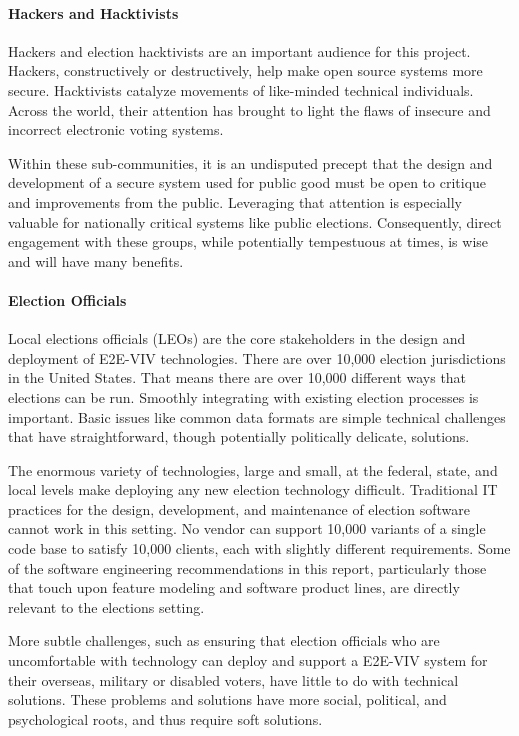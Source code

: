 \paragraph{Hackers and Hacktivists} 
Hackers and election hacktivists are an important audience for this
project. Hackers, constructively or destructively, help make open
source systems more secure. Hacktivists catalyze movements of
like-minded technical individuals. Across the world, their attention
has brought to light the flaws of insecure and incorrect electronic
voting systems.

Within these sub-communities, it is an undisputed precept that the
design and development of a secure system used for public good must be
open to critique and improvements from the public. Leveraging that
attention is especially valuable for nationally critical systems like
public elections. Consequently, direct engagement with these groups,
while potentially tempestuous at times, is wise and will have many
benefits.

\paragraph{Election Officials} 
Local elections officials (LEOs) are the core stakeholders in the
design and deployment of E2E-VIV technologies. There are over 10,000
election jurisdictions in the United States. That means there are over
10,000 different ways that elections can be run. Smoothly integrating
with existing election processes is important. Basic issues like
common data formats are simple technical challenges that have
straightforward, though potentially politically delicate, solutions.

The enormous variety of technologies, large and small, at the federal,
state, and local levels make deploying any new election technology
difficult. Traditional IT practices for the design, development, and
maintenance of election software cannot work in this setting. No
vendor can support 10,000 variants of a single code base to satisfy
10,000 clients, each with slightly different requirements. Some of the
software engineering recommendations in this report, particularly
those that touch upon feature modeling and software product lines, are
directly relevant to the elections setting.

More subtle challenges, such as ensuring that election officials who
are uncomfortable with technology can deploy and support a E2E-VIV
system for their overseas, military or disabled voters, have little to
do with technical solutions. These problems and solutions have more
social, political, and psychological roots, and thus require soft
solutions.


